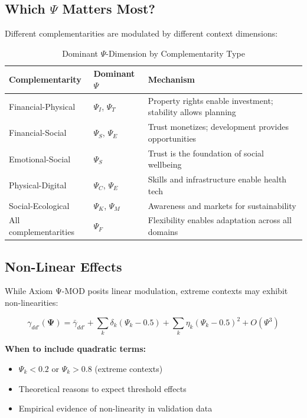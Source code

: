 \subsection{Which $\Psi$ Matters Most?}

Different complementarities are modulated by different context dimensions:

\begin{table}[htbp]
\centering
\caption{Dominant $\Psi$-Dimension by Complementarity Type}
\label{tab:V-dominant-psi}
\small
\begin{tabular}{@{}llp{5cm}@{}}
\toprule
\textbf{Complementarity} & \textbf{Dominant $\Psi$} & \textbf{Mechanism} \\
\midrule
Financial-Physical & $\Psi_I$, $\Psi_T$ & Property rights enable investment; stability allows planning \\
Financial-Social & $\Psi_S$, $\Psi_E$ & Trust monetizes; development provides opportunities \\
Emotional-Social & $\Psi_S$ & Trust is the foundation of social wellbeing \\
Physical-Digital & $\Psi_C$, $\Psi_E$ & Skills and infrastructure enable health tech \\
Social-Ecological & $\Psi_K$, $\Psi_M$ & Awareness and markets for sustainability \\
All complementarities & $\Psi_F$ & Flexibility enables adaptation across all domains \\
\bottomrule
\end{tabular}
\end{table}

\subsection{Non-Linear Effects}

While Axiom Ψ-MOD posits linear modulation, extreme contexts may exhibit 
non-linearities:

\begin{equation}
\gamma_{dd'}(\boldsymbol{\Psi}) = \bar{\gamma}_{dd'} + \sum_k \delta_k (\Psi_k - 0.5) 
+ \sum_k \eta_k (\Psi_k - 0.5)^2 + O(\Psi^3)
\label{eq:V-nonlinear}
\end{equation}

\textbf{When to include quadratic terms:}
\begin{itemize}[nosep]
    \item $\Psi_k < 0.2$ or $\Psi_k > 0.8$ (extreme contexts)
    \item Theoretical reasons to expect threshold effects
    \item Empirical evidence of non-linearity in validation data
\end{itemize}

